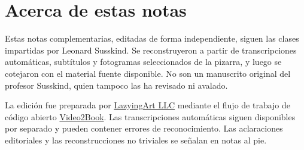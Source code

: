 \documentclass[11pt,oneside]{book}
\begin{document}
\frontmatter
\hypersetup{pageanchor=false}

\hypersetup{pageanchor=true}

\clearpage
\chapter{Acerca de estas notas}
Estas notas complementarias, editadas de forma independiente, siguen las clases impartidas por Leonard Susskind. Se reconstruyeron a partir de transcripciones automáticas, subtítulos y fotogramas seleccionados de la pizarra, y luego se cotejaron con el material fuente disponible. No son un manuscrito original del profesor Susskind, quien tampoco las ha revisado ni avalado.

La edición fue preparada por \href{https://lazying.art}{LazyingArt LLC} mediante el flujo de trabajo de código abierto \href{https://github.com/lachlanchen/Video2Book}{Video2Book}. Las transcripciones automáticas siguen disponibles por separado y pueden contener errores de reconocimiento. Las aclaraciones editoriales y las reconstrucciones no triviales se señalan en notas al pie.
\clearpage
\tableofcontents
\mainmatter










\end{document}
